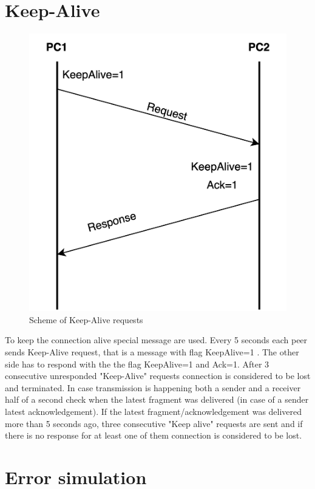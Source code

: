 \documentclass{article}
\begin{document}
\section{Keep-Alive}

\begin{figure}[h]
    \centering
    \includegraphics[width=\textwidth]{images/keepalive.png}
    \caption{Scheme of Keep-Alive requests}
    \label{fig:mesh1}
\end{figure}
To keep the connection alive special message are used. Every 5 seconds each peer sends Keep-Alive request, that is a message with flag KeepAlive=1 . The other side has to respond with the the flag KeepAlive=1 and Ack=1. After 3 consecutive unresponded "Keep-Alive" requests connection is considered to be lost and terminated. In case transmission is happening both a sender and a receiver half of a second check when the latest fragment was delivered (in case of a sender latest acknowledgement). If the latest fragment/acknowledgement was delivered more than 5 seconds ago, three consecutive "Keep alive" requests are sent and if there is no response for at least one of them connection is considered to be lost.

\newpage

\section{Error simulation}
\end{document}
